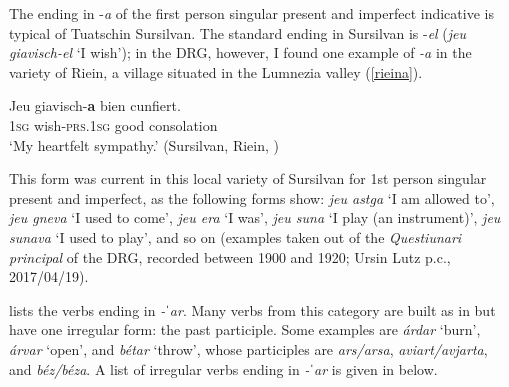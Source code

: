 The ending in -\textit{a} of the first person singular present and imperfect indicative is typical of Tuatschin Sursilvan. The standard ending in Sursilvan is -\textit{el} (\textit{jeu giavisch-el} `I wish'); in the DRG, however, I found one example of \textit{-a} in the variety of Riein, a village situated in the Lumnezia valley (\ref{rieina}).

\ea\label{rieina}
\gll  Jeu giavisch-\textbf{a} bien cunfiert.  \\
     \textsc{1sg} wish-\textsc{prs.1sg} good consolation\\
\glt `My heartfelt sympathy.' (Sursilvan, Riein, )
\z

This form was current in this local variety of Sursilvan for 1st person singular present and imperfect, as the following forms show: \textit{jeu astga} `I am allowed to', \textit{jeu gneva} `I used to come', \textit{jeu era} `I was', \textit{jeu suna} `I play (an instrument)', \textit{jeu sunava} `I used to play', and so on (examples taken out of the\textit{ Questiunari principal} of the DRG, recorded between 1900 and 1920; Ursin Lutz p.c., 2017/04/19).


 lists the verbs ending in \textit{-ˈar}. Many verbs from this category are built as in  but have one irregular form: the past participle. Some examples are \textit{árdar} `burn', \textit{árvar} `open', and \textit{bétar} `throw', whose participles are \textit{ars/arsa}, \textit{aviart/avjarta}, and \textit{béz/béza}. A list of irregular verbs ending in \textit{-ˈar} is given in  below.



